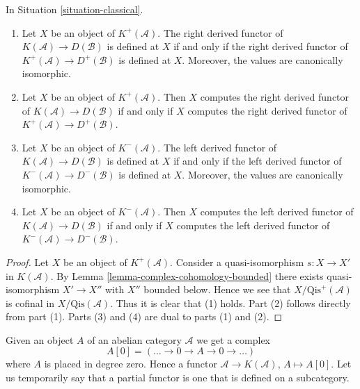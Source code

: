 \begin{lemma}
\label{lemma-irrelevant}
In
Situation \ref{situation-classical}.
\begin{enumerate}
\item Let $X$ be an object of $K^{+}(\mathcal{A})$.
The right derived functor of $K(\mathcal{A}) \to D(\mathcal{B})$
is defined at $X$ if and only if the right derived functor of
$K^{+}(\mathcal{A}) \to D^{+}(\mathcal{B})$ is defined at $X$.
Moreover, the values are canonically isomorphic.
\item Let $X$ be an object of $K^{+}(\mathcal{A})$.
Then $X$ computes the right derived functor of
$K(\mathcal{A}) \to D(\mathcal{B})$
if and only if $X$ computes the right derived functor of
$K^{+}(\mathcal{A}) \to D^{+}(\mathcal{B})$.
\item Let $X$ be an object of $K^{-}(\mathcal{A})$.
The left derived functor of $K(\mathcal{A}) \to D(\mathcal{B})$
is defined at $X$ if and only if the left derived functor of
$K^{-}(\mathcal{A}) \to D^{-}(\mathcal{B})$ is defined at $X$.
Moreover, the values are canonically isomorphic.
\item Let $X$ be an object of $K^{-}(\mathcal{A})$.
Then $X$ computes the left derived functor of
$K(\mathcal{A}) \to D(\mathcal{B})$ if and only if $X$ computes
the left derived functor of $K^{-}(\mathcal{A}) \to D^{-}(\mathcal{B})$.
\end{enumerate}
\end{lemma}

\begin{proof}
Let $X$ be an object of $K^{+}(\mathcal{A})$.
Consider a quasi-isomorphism $s : X \to X'$ in $K(\mathcal{A})$.
By
Lemma \ref{lemma-complex-cohomology-bounded}
there exists quasi-isomorphism $X' \to X''$ with $X''$ bounded below.
Hence we see that $X/\text{Qis}^+(\mathcal{A})$ is cofinal
in $X/\text{Qis}(\mathcal{A})$. Thus it is clear that (1) holds.
Part (2) follows directly from part (1).
Parts (3) and (4) are dual to parts (1) and (2).
\end{proof}

\noindent
Given an object $A$ of an abelian category $\mathcal{A}$ we get a complex
$$
A[0] = ( \ldots \to 0 \to A \to 0 \to \ldots )
$$
where $A$ is placed in degree zero. Hence a functor
$\mathcal{A} \to K(\mathcal{A})$, $A \mapsto A[0]$.
Let us temporarily say that a partial functor is one that is
defined on a subcategory.

